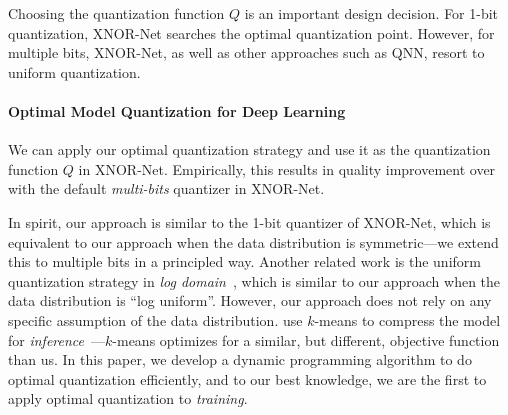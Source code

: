 \documentclass{article}
\begin{document}
Choosing the quantization function $Q$ is
an important design decision. For 1-bit quantization,
XNOR-Net searches the optimal quantization point. However, for multiple bits,
XNOR-Net, as well as other approaches such as QNN, resort
to uniform quantization.

\vspace{-0.5em}
\paragraph*{Optimal Model Quantization for Deep Learning}

We can apply our optimal quantization strategy 
and use it as the quantization function $Q$
in XNOR-Net. Empirically, this results in 
quality improvement
over with the default {\em multi-bits} quantizer in XNOR-Net. 

In spirit, our approach is similar to the 1-bit quantizer of
XNOR-Net, which is equivalent to our approach when the data
distribution is symmetric---we extend this
to multiple bits in a principled way. Another related work
is the uniform quantization strategy 
in {\em log domain}~\cite{miyashita2016convolutional},
which is similar to our approach when the data distribution
is ``log uniform''. However, our approach does not rely on
any specific assumption of the data distribution.
\citet{Han:2016:ICLR} use $k$-means to
compress the model for {\em inference}~---$k$-means
optimizes for a similar, but different, objective
function than us. In this paper, we 
develop a dynamic
programming algorithm to do optimal quantization efficiently,
and to our best knowledge, we
are the first to apply optimal quantization to
{\em training}.





\end{document}
